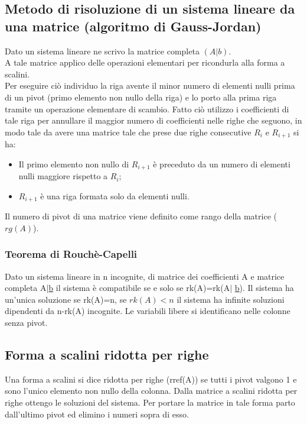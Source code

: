 \subsection{Metodo di risoluzione di un sistema lineare da una matrice (algoritmo di Gauss-Jordan)}
Dato un sistema lineare ne scrivo la matrice completa $(A|b)$.\\
A tale matrice applico delle operazioni elementari per ricondurla alla forma a scalini.\\
Per eseguire ci\`o individuo la riga avente il minor numero di elementi nulli prima di un pivot (primo elemento non nullo della riga) e lo porto alla prima riga tramite un operazione elementare di scambio. Fatto ci\`o utilizzo i coefficienti di tale riga per annullare il maggior numero di coefficienti nelle righe che seguono, in modo tale da avere una matrice tale che prese due righe consecutive $R_i$ e $R_{i+1}$ si ha:
\begin{itemize}
\item Il primo elemento non nullo di $R_{i+1}$ è preceduto da un numero di elementi nulli maggiore rispetto a $R_i$;
\item $R_{i+1}$ è una riga formata solo da elementi nulli.
\end{itemize}
Il numero di pivot di una matrice viene definito come rango della matrice ($rg(A)$).
\subsubsection{Teorema di Rouch\`e-Capelli}
Dato un sistema lineare in n incognite, di matrice dei coefficienti A e matrice completa A$|$\underline{b} il sistema \`e compatibile se e solo se rk(A)=rk(A$|$
\underline{b}). Il sistema ha un'unica soluzione se rk(A)=n, se $rk(A)<n$ il sistema ha infinite soluzioni dipendenti da n-rk(A) incognite. Le variabili libere si 
identificano nelle colonne senza pivot.
\subsection{Forma a scalini ridotta per righe}
Una forma a scalini si dice ridotta per righe (rref(A)) se tutti i pivot valgono 1 e sono l'unico elemento non nullo della colonna. Dalla matrice a scalini ridotta per righe
ottengo le soluzioni del sistema. Per portare la matrice in tale forma parto dall'ultimo pivot ed elimino i numeri sopra di esso.